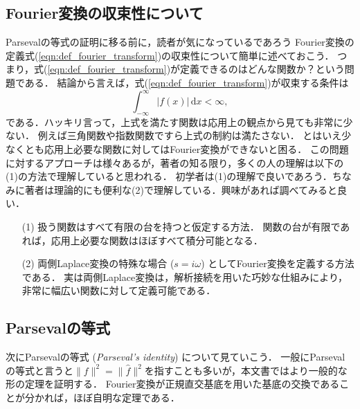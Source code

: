 \subsection*{Fourier変換の収束性について}

Parsevalの等式の証明に移る前に，読者が気になっているであろう
Fourier変換の定義式(\ref{eqn:def_fourier_transform})の収束性について簡単に述べておこう．
つまり，式(\ref{eqn:def_fourier_transform})が定義できるのはどんな関数か？という問題である．
結論から言えば，式(\ref{eqn:def_fourier_transform})が収束する条件は
\begin{equation}
    \int_{-\infty}^{\infty} |f(x)| \, \mathrm{d}x < \infty,
\end{equation}
である．ハッキリ言って，上式を満たす関数は応用上の観点から見ても非常に少ない．
例えば三角関数や指数関数ですら上式の制約は満たさない．
とはいえ少なくとも応用上必要な関数に対してはFourier変換ができないと困る．
この問題に対するアプローチは様々あるが，著者の知る限り，多くの人の理解は以下の(1)の方法で理解していると思われる．
初学者は(1)の理解で良いであろう．ちなみに著者は理論的にも便利な(2)で理解している．興味があれば調べてみると良い．
\begin{enumerate}
    \item[(1)] 扱う関数はすべて有限の台を持つと仮定する方法．
               関数の台が有限であれば，応用上必要な関数はほぼすべて積分可能となる．
    \item[(2)] 両側Laplace変換の特殊な場合 ($s = i\omega$) としてFourier変換を定義する方法である．
               実は両側Laplace変換は，解析接続を用いた巧妙な仕組みにより，非常に幅広い関数に対して定義可能である．
\end{enumerate}

\subsection*{Parsevalの等式}

次にParsevalの等式 (\textit{Parseval's identity}) について見ていこう．
一般にParsevalの等式と言うと$\|f\|^2 = \|\widehat{f}\|^2$を指すことも多いが，本文書ではより一般的な形の定理を証明する．
Fourier変換が正規直交基底を用いた基底の交換であることが分かれば，ほぼ自明な定理である．

